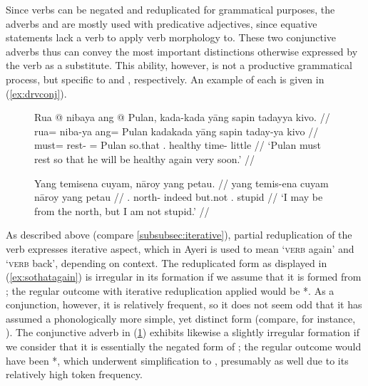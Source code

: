 Since verbs can be negated and reduplicated for grammatical purposes, the
adverbs  and  are mostly used with predicative adjectives, since equative statements
lack a verb to apply verb morphology to. These two conjunctive adverbs thus can
convey the most important distinctions otherwise expressed by the verb as a
substitute. This ability, however, is not a productive grammatical process, but
specific to  and , respectively. An
example of each is given in (\ref{ex:drvconj}).

\begin{figure}[h]
\pex\label{ex:drvconj}
\a\label{ex:sothatagain}\begingl
	\gla Rua @ nibaya ang @ Pulan, kada-kada yāng sapin tadayya kivo. //
	\glb rua= niba-ya ang= Pulan kada\til{}kada yāng sapin taday-ya kivo //
	\glc must= rest-\TsgM{} \Aarg{}= Pulan \Iter{}\til{}so.that 
		\TsgM{}.\Aarg{} healthy time-\Loc{} little //
	\glft `Pulan must rest so that he will be healthy again very soon.' //
\endgl

\a\label{ex:butnot}\begingl
	\gla Yang temisena cuyam, nāroy yang petau. //
	\glb yang temis-ena cuyam nāroy yang petau //
	\glc \Fsg{}.\Aarg{} north-\Gen{} indeed but.not \Fsg{}.\Aarg{} stupid //
	\glft `I may be from the north, but I am not stupid.' //
\endgl
\xe
\end{figure}

As described above (compare \autoref{subsubsec:iterative}), partial
reduplication of the verb expresses iterative aspect, which in Ayeri is used
to mean `\textsc{verb} again' and `\textsc{verb} back', depending on context.
The reduplicated form  as displayed in
(\ref{ex:sothatagain}) is irregular in its formation if we assume that it is
formed from ; the regular outcome with
iterative reduplication applied would be *. As a
conjunction, however, it is relatively frequent, so it does not seem odd that
it has assumed a phonologically more simple, yet distinct form (compare, for
instance, \cite[11--12]{bybeehopper2001b}). The conjunctive adverb in
(\ref{ex:butnot}) exhibits likewise a slightly irregular formation if we
consider that it is essentially the negated form of ;
the regular outcome would have been *, which underwent
simplification to , presumably as well due to its
relatively high token frequency.


